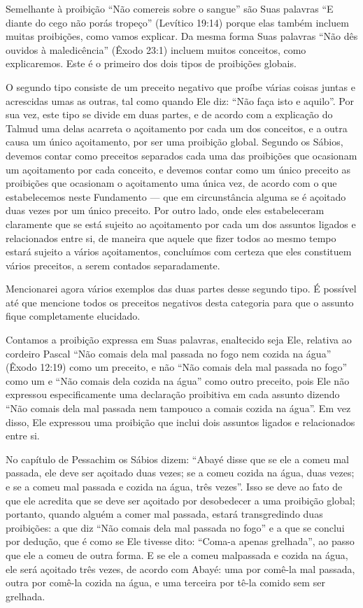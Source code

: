 Semelhante à proibição ``Não comereis sobre o sangue'' são Suas
palavras ``E diante do cego não porás tropeço'' (Levítico 19:14) porque
elas também incluem muitas proibições, como vamos explicar. Da mesma
forma Suas palavras ``Não dês ouvidos à maledicência'' (Êxodo 23:1)
incluem muitos conceitos, como explicaremos. Este é o primeiro dos dois
tipos de proibições globais.

O segundo tipo consiste de um preceito negativo que proíbe várias coisas
juntas e acrescidas umas as outras, tal como quando Ele diz: ``Não faça
isto e aquilo''. Por sua vez, este tipo se divide em duas partes, e de
acordo com a explicação do Talmud uma delas acarreta o açoitamento por
cada um dos conceitos, e a outra causa um único açoitamento, por ser
uma proibição global. Segundo os Sábios, devemos contar como preceitos
separados cada uma das proibições que ocasionam um açoitamento por cada
conceito, e devemos contar como um único preceito as proibições que
ocasionam o açoitamento uma única vez, de acordo com o que estabelecemos
neste Fundamento --- que em circunstância alguma se é açoitado duas
vezes por um único preceito. Por outro lado, onde eles estabeleceram
claramente que se está sujeito ao açoitamento por cada um dos assuntos
ligados e relacionados entre si, de maneira que aquele que fizer todos
ao mesmo tempo estará sujeito a vários açoitamentos, concluímos com
certeza que eles constituem vários preceitos, a serem contados
separadamente.

Mencionarei agora vários exemplos das duas partes desse segundo tipo. É
possível até que mencione todos os preceitos negativos desta categoria
para que o assunto fique completamente elucidado.

Contamos a proibição expressa em Suas palavras, enaltecido seja Ele,
relativa ao cordeiro Pascal ``Não comais dela mal passada no fogo nem
cozida na água'' (Êxodo 12:19) como um preceito, e não ``Não comais dela
mal passada no fogo'' como um e ``Não comais dela cozida na água'' como
outro preceito, pois Ele não expressou especificamente uma declaração
proibitiva em cada assunto dizendo ``Não comais dela mal passada nem
tampouco a comais cozida na água''. Em vez disso, Ele expressou uma
proibição que inclui dois assuntos ligados e relacionados entre si.

No capítulo de Pessachim os Sábios dizem: ``Abayé disse que se ele a
comeu mal passada, ele deve ser açoitado duas vezes; se a comeu cozida
na água, duas vezes; e se a comeu mal passada e cozida na água, três
vezes''. Isso se deve ao fato de que ele acredita que se deve ser
açoitado por desobedecer a uma proibição global; portanto, quando alguém
a comer mal passada, estará transgredindo duas proibições: a que diz
``Não comais dela mal passada no fogo'' e a que se conclui por dedução,
que é como se Ele tivesse dito: ``Coma-a apenas grelhada'', ao passo que
ele a comeu de outra forma. E se ele a comeu malpassada e cozida na
água, ele será açoitado três vezes, de acordo com Abayé: uma por
comê-la mal passada, outra por comê-la cozida na água, e uma terceira
por tê-la comido sem ser grelhada.

